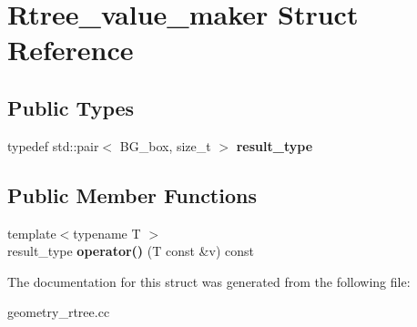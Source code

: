 \hypertarget{structRtree__value__maker}{}\section{Rtree\+\_\+value\+\_\+maker Struct Reference}
\label{structRtree__value__maker}
\subsection*{Public Types}
\begin{DoxyCompactItemize}
\item 
\mbox{\label{structRtree__value__maker_aa918f7fd9169305bbcb9dd55cceab7db}} 
typedef std\+::pair$<$ B\+G\+\_\+box, size\+\_\+t $>$ {\bfseries result\+\_\+type}
\end{DoxyCompactItemize}
\subsection*{Public Member Functions}
\begin{DoxyCompactItemize}
\item 
\mbox{\label{structRtree__value__maker_afb8bb77a191cacd1866ec59f357ad982}} 
{\footnotesize template$<$typename T $>$ }\\result\+\_\+type {\bfseries operator()} (T const \&v) const
\end{DoxyCompactItemize}


The documentation for this struct was generated from the following file\+:\begin{DoxyCompactItemize}
\item 
geometry\+\_\+rtree.\+cc\end{DoxyCompactItemize}
